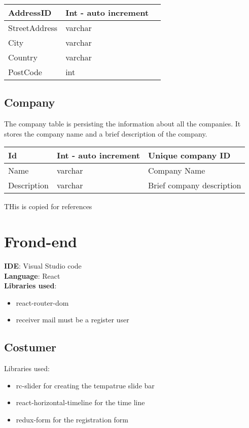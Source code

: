 \begin{center}
\begin{tabular}{ |l|l|l| } 
 \hline
AddressID & Int - auto increment & \\
 \hline
StreetAddress  & varchar  & \\
 \hline
City  & varchar &\\
 \hline
Country  & varchar &\\
 \hline
PostCode  & int &\\
 \hline
\end{tabular}
\end{center}




\subsection{Company}
The company table is persisting the information about all the companies. It stores the company name and a brief description of the company. 

\begin{center}
\begin{tabular}{ |l|l|l| } 
 \hline
Id & Int - auto increment & Unique company ID \\
 \hline
Name & varchar & Company Name \\
 \hline
Description & varchar & Brief company description \\
 \hline
\end{tabular}
\end{center}


THis is copied for references
\section{Frond-end}

\textbf{IDE}: Visual Studio code\\
\textbf{Language}: React\\
\textbf{Libraries used}:
\begin{itemize}
    \item react-router-dom
    \item receiver mail must be a register user
\end{itemize}


\subsection{Costumer}
Libraries used:
\begin{itemize}
\item rc-slider for creating the tempatrue slide bar 
\item react-horizontal-timeline for the time line
\item redux-form for the registration form
\end{itemize}